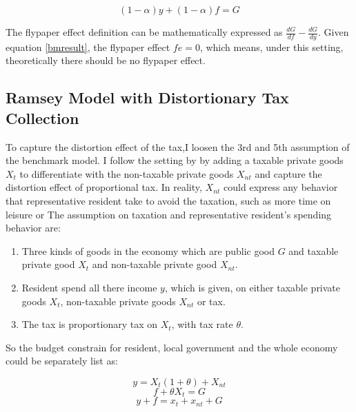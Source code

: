 \begin{equation}
    (1-\alpha)y+(1-\alpha)f=G \label{bmresult}
\end{equation}

The flypaper effect definition can be mathematically expressed as $\frac{d G}{d f}-\frac{d G}{d y}$. Given equation \ref{bmresult}, the flypaper effect $fe=0$, which means, under this setting, theoretically there should be no flypaper effect.

\subsection{Ramsey Model with Distortionary Tax Collection}

To capture the distortion effect of the tax,I loosen the 3rd and 5th assumption of the benchmark model. I follow the setting by \textcite{vegh2016unsticking} by adding a taxable private goods $X_t$ to differentiate with the non-taxable private goods $X_{nt}$ and capture the distortion effect of proportional tax. In reality, $X_{nt}$ could express any behavior that representative resident take to avoid the taxation, such as more time on leisure or
The assumption on taxation and representative resident's spending behavior are:

\begin{enumerate}
    \item Three kinds of goods in the economy which are public good $G$ and taxable private good $X_t$ and non-taxable private good $X_{nt}$.\label{Xt}
    \item Resident spend all there income $y$, which is given, on either taxable private goods $X_t$, non-taxable private goods $X_{nt}$ or tax.
    \item The tax is proportionary tax on $X_{t}$, with tax rate $\theta$.
\end{enumerate}

So the budget constrain for resident, local government and the whole economy could be separately list as:

\begin{equation} \label{distortionrct}
    y=X_t(1+\theta)+X_{n t}
\end{equation}
\begin{equation} \label{distortiongct}
    f+\theta X_t=G
\end{equation}
\begin{equation} \label{distortionect}
    y+f=x_t+x_{nt}+G
\end{equation}

